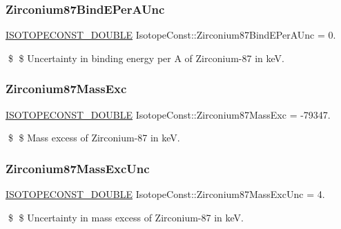 \subsubsection{\texorpdfstring{Zirconium87\+Bind\+E\+Per\+A\+Unc}{Zirconium87BindEPerAUnc}}
{\footnotesize\ttfamily \mbox{\hyperlink{group___isotope_const-_macros_ga8f45a7272ce02c0b4c65c44636ed719a}{I\+S\+O\+T\+O\+P\+E\+C\+O\+N\+S\+T\+\_\+\+D\+O\+U\+B\+LE}} Isotope\+Const\+::\+Zirconium87\+Bind\+E\+Per\+A\+Unc = 0.}

\$ \$ Uncertainty in binding energy per A of Zirconium-\/87 in keV. \mbox{\label{group___isotope_const-_zirconium-_zr87_ga423696211c7902e900f6728e8bc5fe50}} 
\subsubsection{\texorpdfstring{Zirconium87\+Mass\+Exc}{Zirconium87MassExc}}
{\footnotesize\ttfamily \mbox{\hyperlink{group___isotope_const-_macros_ga8f45a7272ce02c0b4c65c44636ed719a}{I\+S\+O\+T\+O\+P\+E\+C\+O\+N\+S\+T\+\_\+\+D\+O\+U\+B\+LE}} Isotope\+Const\+::\+Zirconium87\+Mass\+Exc = -\/79347.}

\$ \$ Mass excess of Zirconium-\/87 in keV. \mbox{\label{group___isotope_const-_zirconium-_zr87_ga5b6fcdf67c4705a774a2d2876e10b53d}} 
\subsubsection{\texorpdfstring{Zirconium87\+Mass\+Exc\+Unc}{Zirconium87MassExcUnc}}
{\footnotesize\ttfamily \mbox{\hyperlink{group___isotope_const-_macros_ga8f45a7272ce02c0b4c65c44636ed719a}{I\+S\+O\+T\+O\+P\+E\+C\+O\+N\+S\+T\+\_\+\+D\+O\+U\+B\+LE}} Isotope\+Const\+::\+Zirconium87\+Mass\+Exc\+Unc = 4.}

\$ \$ Uncertainty in mass excess of Zirconium-\/87 in keV. \mbox{\label{group___isotope_const-_zirconium-_zr87_ga4caee31b85f46384a5a8b2161c95c06f}} 
